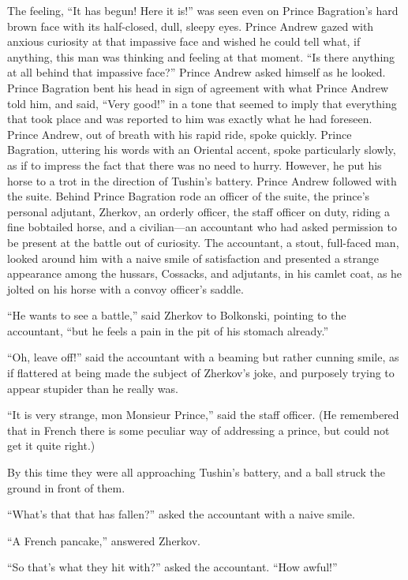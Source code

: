 The feeling, ``It has begun! Here it is!'' was seen even on
Prince Bagration's hard brown face with its half-closed, dull,
sleepy eyes.  Prince Andrew gazed with anxious curiosity at that
impassive face and wished he could tell what, if anything, this
man was thinking and feeling at that moment. ``Is there anything
at all behind that impassive face?'' Prince Andrew asked himself
as he looked. Prince Bagration bent his head in sign of agreement
with what Prince Andrew told him, and said, ``Very good!'' in a
tone that seemed to imply that everything that took place and was
reported to him was exactly what he had foreseen.  Prince Andrew,
out of breath with his rapid ride, spoke quickly. Prince
Bagration, uttering his words with an Oriental accent, spoke
particularly slowly, as if to impress the fact that there was no
need to hurry. However, he put his horse to a trot in the
direction of Tushin's battery. Prince Andrew followed with the
suite. Behind Prince Bagration rode an officer of the suite, the
prince's personal adjutant, Zherkov, an orderly officer, the
staff officer on duty, riding a fine bobtailed horse, and a
civilian---an accountant who had asked permission to be present
at the battle out of curiosity. The accountant, a stout,
full-faced man, looked around him with a naive smile of
satisfaction and presented a strange appearance among the
hussars, Cossacks, and adjutants, in his camlet coat, as he
jolted on his horse with a convoy officer's saddle.

``He wants to see a battle,'' said Zherkov to Bolkonski, pointing
to the accountant, ``but he feels a pain in the pit of his
stomach already.''

``Oh, leave off!'' said the accountant with a beaming but rather
cunning smile, as if flattered at being made the subject of
Zherkov's joke, and purposely trying to appear stupider than he
really was.

``It is very strange, mon Monsieur Prince,'' said the staff
officer. (He remembered that in French there is some peculiar way
of addressing a prince, but could not get it quite right.)

By this time they were all approaching Tushin's battery, and a
ball struck the ground in front of them.

``What's that that has fallen?'' asked the accountant with a
naive smile.

``A French pancake,'' answered Zherkov.

``So that's what they hit with?'' asked the accountant. ``How
awful!''

